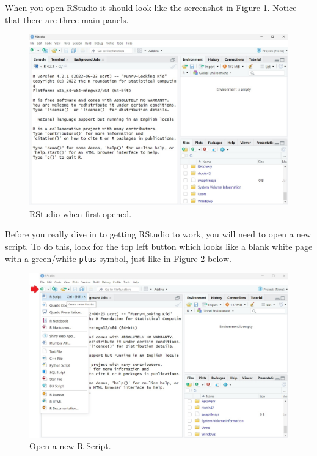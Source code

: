 \documentclass[
]{book}
\begin{document}
When you open RStudio it should look like the screenshot in Figure \ref{fig:fig3}. Notice that there are three main panels.

\begin{figure}

{\centering \includegraphics[width=1\linewidth]{images/rstudio1} 

}

\caption{RStudio when first opened.}\label{fig:fig3}
\end{figure}

Before you really dive in to getting RStudio to work, you will need to open a new script. To do this, look for the top left button which looks like a blank white page with a green/white \texttt{plus} symbol, just like in Figure \ref{fig:fig4} below.

\begin{figure}

{\centering \includegraphics[width=1\linewidth]{images/rscript} 

}

\caption{Open a new R Script.}\label{fig:fig4}
\end{figure}
\end{document}
